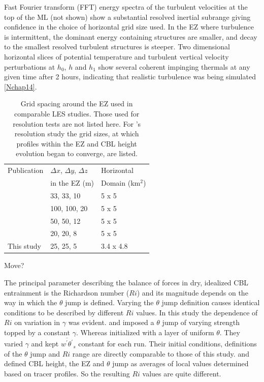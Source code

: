 \documentclass[referee]{svjour3}
\begin{document}
Fast Fourier transform (FFT) energy spectra of the turbulent velocities at the top of the ML (not shown) show a substantial resolved inertial subrange giving confidence in the choice of horizontal grid size used. In the EZ where turbulence is intermittent, the dominant energy containing structures are smaller, and decay to the smallest resolved turbulent structures is steeper. Two dimensional horizontal slices of potential temperature and turbulent vertical velocity perturbations at $h_{0}$, $h$ and $h_{1}$ show several coherent impinging thermals at any given time after 2 hours, indicating that realistic turbulence was being simulated \ref{Nchap14}.\\

\begin{table}[htbp]
\caption[Comparison of Grid-Sizes used in similar Studies]{Grid spacing around the EZ used in comparable LES studies. Those used for resolution tests are not listed here.  For \cite{SullPat}'s resolution study the grid sizes, at which profiles within the EZ and CBL height evolution began to converge, are listed.}

    \begin{tabular}{p{4cm} p{2cm} p{2cm}}
Publication & $\Delta x$, $\Delta y$, $\Delta z$ & Horizontal \\
 & in the EZ (m) & Domain (km$^{2}$) \\ \hline
      \cite{Sullivan98}& 33, 33, 10 & 5 x 5 \\ 
      \cite{Fedorovich04}& 100, 100, 20 & 5 x 5 \\ 
      \cite{Brooks12}& 50, 50, 12 & 5 x 5 \\
      \cite{SullPat} &  20, 20, 8 & 5 x 5\\
      This study & 25, 25, 5 &  3.4 x 4.8\\ \hline       
    \end{tabular}
\label{table:gridcomp}   
\end{table}

Move?

The principal parameter describing the balance of forces in dry, idealized CBL entrainment is the Richardson number ($Ri$) and its magnitude depends on the way in which the $\theta$ jump is defined.  Varying the $\theta$ jump definition causes identical conditions to be described by different $Ri$ values.  In this study the dependence of $Ri$ on variation in $\gamma$ was evident.  \cite{Brooks12} and \cite{Sullivan98} imposed a $\theta$ jump of varying strength topped by a constant $\gamma$.  Whereas \cite{Fedorovich04} initialized with a layer of uniform $\theta$.  They varied $\gamma$ and kept $\overline{w^{'}\theta^{'}}_{s}$ constant for each run.  Their initial conditions, definitions of the $\theta$ jump and $Ri$ range are directly comparable to those of this study.  \cite{Brooks12} and \cite{Sullivan98} defined CBL height, the EZ and $\theta$ jump as averages of local values determined based on tracer profiles.  So the resulting $Ri$ values are quite different.    
\end{document}
